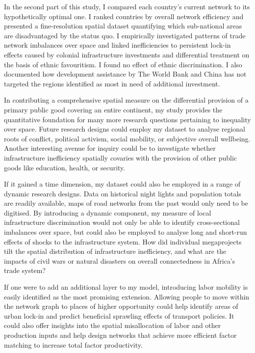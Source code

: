 \documentclass[11pt, oneside]{article}   	%
\begin{document}
In the second part of this study, I compared each country's current network to its hypothetically optimal one. I ranked countries by overall network efficiency and presented a fine-resolution spatial dataset quantifying which sub-national areas are disadvantaged by the status quo. I empirically investigated patterns of trade network imbalances over space and linked inefficiencies to persistent lock-in effects caused by colonial infrastructure investments and differential treatment on the basis of ethnic favouritism. I found no effect of ethnic discrimination. I also documented how development assistance by The World Bank and China has not targeted the regions identified as most in need of additional investment.

In contributing a comprehensive spatial measure on the differential provision of a primary public good covering an entire continent, my study provides the quantitative foundation for many more research questions pertaining to inequality over space. Future research designs could employ my dataset to analyse regional roots of conflict, political activism, social mobility, or subjective overall wellbeing. Another interesting avenue for inquiry could be to investigate whether infrastructure inefficiency spatially covaries with the provision of other public goods like education, health, or security.

If it gained a time dimension, my dataset could also be employed in a range of dynamic research designs. Data on historical night lights and population totals are readily available, maps of road networks from the past would only need to be digitised. By introducing a dynamic component, my measure of local infrastructure discrimination would not only be able to identify cross-sectional imbalances over space, but could also be employed to analyse long and short-run effects of shocks to the infrastructure system. How did individual megaprojects tilt the spatial distribution of infrastructure inefficiency, and what are the impacts of civil wars or natural disasters on overall connectedness in Africa's trade system?

If one were to add an additional layer to my model, introducing labor mobility is easily identified as the most promising extension. Allowing people to move within the network graph to places of higher opportunity could help identify areas of urban lock-in and predict beneficial sprawling effects of transport policies. It could also offer insights into the spatial misallocation of labor and other production inputs and help design networks that achieve more efficient factor matching to increase total factor productivity.
\end{document}
